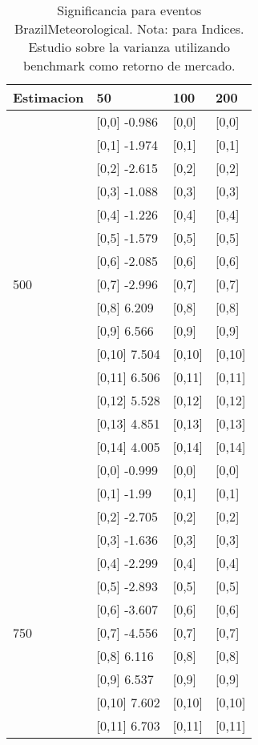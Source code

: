 \begin{table}

\caption{Significancia para eventos BrazilMeteorological. Nota: para Indices. Estudio sobre la varianza utilizando benchmark como retorno de mercado.}
\centering
\begin{tabular}[t]{llll}
\toprule
Estimacion & 50 & 100 & 200\\
\midrule
 & {}[0,0] -0.986 & {}[0,0] & {}[0,0]\\
 & {}[0,1] -1.974 & {}[0,1] & {}[0,1]\\
 & {}[0,2] -2.615 & {}[0,2] & {}[0,2]\\
 & {}[0,3] -1.088 & {}[0,3] & {}[0,3]\\
 & {}[0,4] -1.226 & {}[0,4] & {}[0,4]\\
\addlinespace
 & {}[0,5] -1.579 & {}[0,5] & {}[0,5]\\
 & {}[0,6] -2.085 & {}[0,6] & {}[0,6]\\
500 & {}[0,7] -2.996 & {}[0,7] & {}[0,7]\\
 & {}[0,8] 6.209 & {}[0,8] & {}[0,8]\\
 & {}[0,9] 6.566 & {}[0,9] & {}[0,9]\\
\addlinespace
 & {}[0,10] 7.504 & {}[0,10] & {}[0,10]\\
 & {}[0,11] 6.506 & {}[0,11] & {}[0,11]\\
 & {}[0,12] 5.528 & {}[0,12] & {}[0,12]\\
 & {}[0,13] 4.851 & {}[0,13] & {}[0,13]\\
 & {}[0,14] 4.005 & {}[0,14] & {}[0,14]\\
\addlinespace
 & {}[0,0] -0.999 & {}[0,0] & {}[0,0]\\
 & {}[0,1] -1.99 & {}[0,1] & {}[0,1]\\
 & {}[0,2] -2.705 & {}[0,2] & {}[0,2]\\
 & {}[0,3] -1.636 & {}[0,3] & {}[0,3]\\
 & {}[0,4] -2.299 & {}[0,4] & {}[0,4]\\
\addlinespace
 & {}[0,5] -2.893 & {}[0,5] & {}[0,5]\\
 & {}[0,6] -3.607 & {}[0,6] & {}[0,6]\\
750 & {}[0,7] -4.556 & {}[0,7] & {}[0,7]\\
 & {}[0,8] 6.116 & {}[0,8] & {}[0,8]\\
 & {}[0,9] 6.537 & {}[0,9] & {}[0,9]\\
\addlinespace
 & {}[0,10] 7.602 & {}[0,10] & {}[0,10]\\
 & {}[0,11] 6.703 & {}[0,11] & {}[0,11]\\

\end{tabular}
\end{table}
